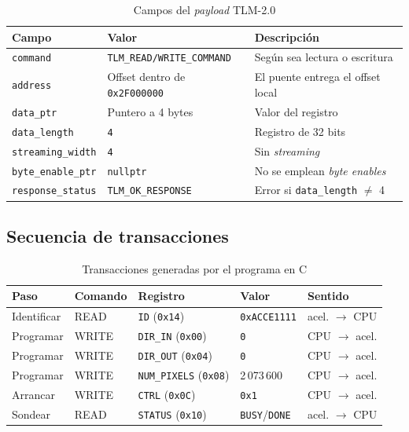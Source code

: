 \documentclass[11pt,letterpaper]{article}
\begin{document}
\begin{table}[H]
\centering
\caption{Campos del \emph{payload} TLM-2.0}
\begin{tabular}{@{}p{3.3cm}p{5.3cm}p{6.2cm}@{}}
\toprule
\textbf{Campo} & \textbf{Valor} & \textbf{Descripción} \\
\midrule
\texttt{command}          & \texttt{TLM\_READ/WRITE\_COMMAND} & Según sea
  lectura o escritura \\
\texttt{address}          & Offset dentro de \texttt{0x2F000000} & El puente
  entrega el offset local \\
\texttt{data\_ptr}        & Puntero a 4 bytes & Valor del registro \\
\texttt{data\_length}     & \texttt{4} & Registro de 32 bits \\
\texttt{streaming\_width} & \texttt{4} & Sin \emph{streaming} \\
\texttt{byte\_enable\_ptr}& \texttt{nullptr} & No se emplean \emph{byte enables} \\
\texttt{response\_status} & \texttt{TLM\_OK\_RESPONSE} & Error si
  \texttt{data\_length} $\neq$ 4 \\
\bottomrule
\end{tabular}
\end{table}

\subsection{Secuencia de transacciones}

\begin{table}[H]
\centering
\caption{Transacciones generadas por el programa en C}
\begin{tabular}{@{}lllll@{}}
\toprule
\textbf{Paso} & \textbf{Comando} & \textbf{Registro} & \textbf{Valor} &
\textbf{Sentido} \\
\midrule
Identificar & READ  & \texttt{ID} (\texttt{0x14})         & \texttt{0xACCE1111}
  & acel. $\rightarrow$ CPU \\
Programar   & WRITE & \texttt{DIR\_IN} (\texttt{0x00})    & \texttt{0}
  & CPU $\rightarrow$ acel. \\
Programar   & WRITE & \texttt{DIR\_OUT} (\texttt{0x04})   & \texttt{0}
  & CPU $\rightarrow$ acel. \\
Programar   & WRITE & \texttt{NUM\_PIXELS} (\texttt{0x08})& 2\,073\,600
  & CPU $\rightarrow$ acel. \\
Arrancar    & WRITE & \texttt{CTRL} (\texttt{0x0C})       & \texttt{0x1}
  & CPU $\rightarrow$ acel. \\
Sondear     & READ  & \texttt{STATUS} (\texttt{0x10})     &
  \texttt{BUSY}/\texttt{DONE} & acel. $\rightarrow$ CPU \\
\bottomrule
\end{tabular}
\end{table}
\end{document}
